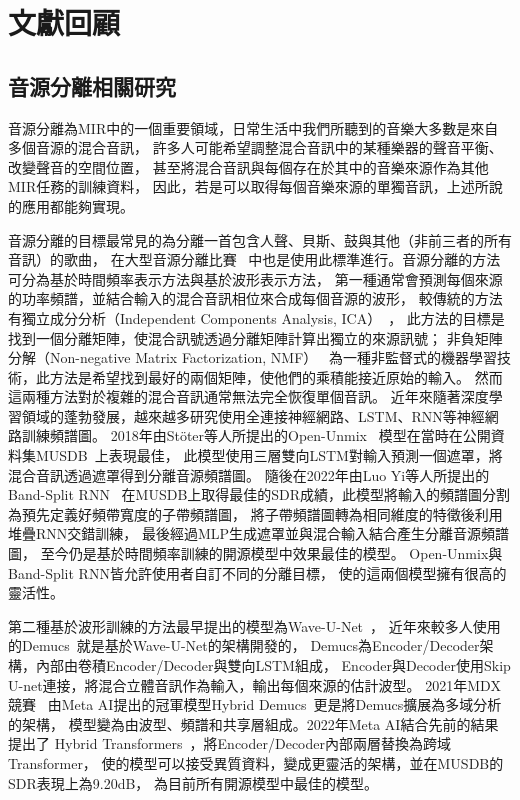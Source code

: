 \documentclass[class=NCU_thesis, crop=false]{standalone}
\begin{document}
\pagebreak

\section{文獻回顧}
\subsection{音源分離相關研究}
音源分離為MIR中的一個重要領域，日常生活中我們所聽到的音樂大多數是來自多個音源的混合音訊，
許多人可能希望調整混合音訊中的某種樂器的聲音平衡、改變聲音的空間位置，
甚至將混合音訊與每個存在於其中的音樂來源作為其他MIR任務的訓練資料，
因此，若是可以取得每個音樂來源的單獨音訊，上述所說的應用都能夠實現。

音源分離的目標最常見的為分離一首包含人聲、貝斯、鼓與其他（非前三者的所有音訊）的歌曲，
在大型音源分離比賽~\cite{Yuki_Mitsufuji2021MusicDemixing, Fabbro_Giorgio2023TheSoundDemixing}
中也是使用此標準進行。音源分離的方法可分為基於時間頻率表示方法與基於波形表示方法，
第一種通常會預測每個來源的功率頻譜，並結合輸入的混合音訊相位來合成每個音源的波形，
較傳統的方法有獨立成分分析（Independent Components Analysis, ICA）~\cite{comon1994independent}，
此方法的目標是找到一個分離矩陣，使混合訊號透過分離矩陣計算出獨立的來源訊號；
非負矩陣分解（Non-negative Matrix Factorization, NMF）~\cite{lee2000algorithms}
為一種非監督式的機器學習技術，此方法是希望找到最好的兩個矩陣，使他們的乘積能接近原始的輸入。
然而這兩種方法對於複雜的混合音訊通常無法完全恢復單個音訊。
近年來隨著深度學習領域的蓬勃發展，越來越多研究使用全連接神經網路、LSTM、RNN等神經網路訓練頻譜圖。
2018年由Stöter等人所提出的Open-Unmix~\cite{FabianRobert_Stöter2019OpenUnmix}
模型在當時在公開資料集MUSDB~\cite{Rafii2017musdb18}上表現最佳，
此模型使用三層雙向LSTM對輸入預測一個遮罩，將混合音訊透過遮罩得到分離音源頻譜圖。
隨後在2022年由Luo Yi等人所提出的Band-Split RNN~\cite{Luo_Yi2022MusicSourceSeparation}
在MUSDB上取得最佳的SDR成績，此模型將輸入的頻譜圖分割為預先定義好頻帶寬度的子帶頻譜圖，
將子帶頻譜圖轉為相同維度的特徵後利用堆疊RNN交錯訓練，
最後經過MLP生成遮罩並與混合輸入結合產生分離音源頻譜圖，
至今仍是基於時間頻率訓練的開源模型中效果最佳的模型。
Open-Unmix與Band-Split RNN皆允許使用者自訂不同的分離目標，
使的這兩個模型擁有很高的靈活性。

第二種基於波形訓練的方法最早提出的模型為Wave-U-Net~\cite{stoller2018wave}，
近年來較多人使用的Demucs~\cite{défossez2021music}就是基於Wave-U-Net的架構開發的，
Demucs為Encoder/Decoder架構，內部由卷積Encoder/Decoder與雙向LSTM組成，
Encoder與Decoder使用Skip U-net連接，將混合立體音訊作為輸入，輸出每個來源的估計波型。
2021年MDX競賽~\cite{Yuki_Mitsufuji2021MusicDemixing}
由Meta AI提出的冠軍模型Hybrid Demucs~\cite{defossez2021hybrid}更是將Demucs擴展為多域分析的架構，
模型變為由波型、頻譜和共享層組成。2022年Meta AI結合先前的結果提出了
Hybrid Transformers~\cite{rouard2023hybrid}，將Encoder/Decoder內部兩層替換為跨域Transformer，
使的模型可以接受異質資料，變成更靈活的架構，並在MUSDB的SDR表現上為9.20dB，
為目前所有開源模型中最佳的模型。
\end{document}
